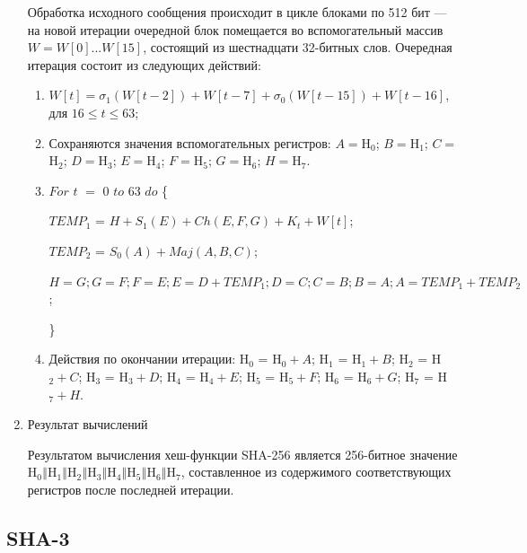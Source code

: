 \documentclass{./civarticle}
\begin{document}
\begin{enumerate}
    Обработка исходного сообщения происходит в цикле блоками по 512 бит --- на новой итерации очередной блок помещается во вспомогательный массив $W = W[0] ... W[15]$, состоящий из шестнадцати 32-битных слов. Очередная итерация состоит из следующих действий:

    \begin{enumerate}
        \item $W[t] = \sigma_1(W[t-2]) + W[t-7] + \sigma_0(W[t-15]) + W[t-16]$, для $16 \leq t \leq 63$;

        \item Сохраняются значения вспомогательных регистров: $A = $H$_0$; $B = $H$_1$; $C = $H$_2$; $D = $H$_3$; $E = $H$_4$; $F = $H$_5$; $G = $H$_6$; $H = $H$_7$.

        \item $For$ $t$ $=$ $0$ $to$ $63$ $do$ \{ 

        \hspace{0.5cm} $TEMP_1$ = $H + S_1(E) + Ch(E, F, G) + K_t + W[t]$;

        \hspace{0.5cm} $TEMP_2$ = $S_0(A) + Maj(A, B, C)$;

        \hspace{0.5cm} $H = G; G = F; F = E; E = D + TEMP_1; D = C; C = B; B = A; A = TEMP_1 + TEMP_2$;
    
        \}

        \item Действия по окончании итерации: H$_0$ = H$_0 + A$; H$_1$ = H$_1 + B$; H$_2$ = H$_2 + C$; H$_3$ = H$_3 + D$; H$_4$ = H$_4 + E$; H$_5$ = H$_5 + F$; H$_6$ = H$_6 + G$; H$_7$ = H$_7 + H$.
        
    \end{enumerate}

    \item Результат вычислений

    Результатом вычисления хеш-функции SHA-256 является 256-битное значение H$_0\mathbin\Vert$H$_1\mathbin\Vert$H$_2\mathbin\Vert$H$_3\mathbin\Vert$H$_4\mathbin\Vert$H$_5\mathbin\Vert$H$_6\mathbin\Vert$H$_7$, составленное из содержимого соответствующих регистров после последней итерации.
    
\end{enumerate}


\subsection{SHA-3}
\end{document}
